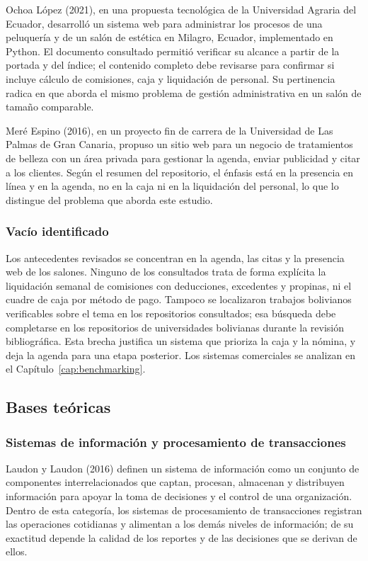 Ochoa López (2021), en una propuesta tecnológica de la Universidad Agraria del Ecuador, desarrolló un sistema web para administrar los procesos de una peluquería y de un salón de estética en Milagro, Ecuador, implementado en Python. El documento consultado permitió verificar su alcance a partir de la portada y del índice; el contenido completo debe revisarse para confirmar si incluye cálculo de comisiones, caja y liquidación de personal. Su pertinencia radica en que aborda el mismo problema de gestión administrativa en un salón de tamaño comparable.


Meré Espino (2016), en un proyecto fin de carrera de la Universidad de Las Palmas de Gran Canaria, propuso un sitio web para un negocio de tratamientos de belleza con un área privada para gestionar la agenda, enviar publicidad y citar a los clientes. Según el resumen del repositorio, el énfasis está en la presencia en línea y en la agenda, no en la caja ni en la liquidación del personal, lo que lo distingue del problema que aborda este estudio.


\subsubsection{Vacío identificado}

Los antecedentes revisados se concentran en la agenda, las citas y la presencia web de los salones. Ninguno de los consultados trata de forma explícita la liquidación semanal de comisiones con deducciones, excedentes y propinas, ni el cuadre de caja por método de pago. Tampoco se localizaron trabajos bolivianos verificables sobre el tema en los repositorios consultados; esa búsqueda debe completarse en los repositorios de universidades bolivianas durante la revisión bibliográfica. Esta brecha justifica un sistema que prioriza la caja y la nómina, y deja la agenda para una etapa posterior. Los sistemas comerciales se analizan en el Capítulo~\ref{cap:benchmarking}.


\subsection{Bases teóricas}

\subsubsection{Sistemas de información y procesamiento de transacciones}

Laudon y Laudon (2016) definen un sistema de información como un conjunto de componentes interrelacionados que captan, procesan, almacenan y distribuyen información para apoyar la toma de decisiones y el control de una organización. Dentro de esta categoría, los sistemas de procesamiento de transacciones registran las operaciones cotidianas y alimentan a los demás niveles de información; de su exactitud depende la calidad de los reportes y de las decisiones que se derivan de ellos.


